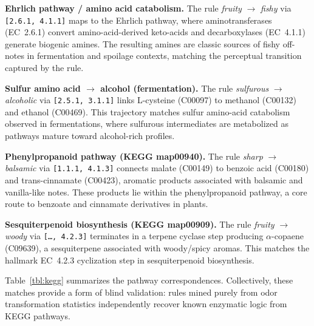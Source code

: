 \documentclass[a4paper,fleqn]{cas-sc}
\begin{document}
\noindent\textbf{Ehrlich pathway / amino acid catabolism.} The rule \emph{fruity} $\rightarrow$ \emph{fishy} via \texttt{[2.6.1, 4.1.1]} maps to the Ehrlich pathway, where aminotransferases (EC~2.6.1) convert amino-acid-derived keto-acids and decarboxylases (EC~4.1.1) generate biogenic amines. The resulting amines are classic sources of fishy off-notes in fermentation and spoilage contexts, matching the perceptual transition captured by the rule. \citep{Hazelwood2008}

\noindent\textbf{Sulfur amino acid $\rightarrow$ alcohol (fermentation).} The rule \emph{sulfurous} $\rightarrow$ \emph{alcoholic} via \texttt{[2.5.1, 3.1.1]} links L-cysteine (C00097) to methanol (C00132) and ethanol (C00469). This trajectory matches sulfur amino-acid catabolism observed in fermentations, where sulfurous intermediates are metabolized as pathways mature toward alcohol-rich profiles. \citep{Kanehisa2021}

\noindent\textbf{Phenylpropanoid pathway (KEGG map00940).} The rule \emph{sharp} $\rightarrow$ \emph{balsamic} via \texttt{[1.1.1, 4.1.3]} connects malate (C00149) to benzoic acid (C00180) and trans-cinnamate (C00423), aromatic products associated with balsamic and vanilla-like notes. These products lie within the phenylpropanoid pathway, a core route to benzoate and cinnamate derivatives in plants. \citep{Kanehisa2021}

\noindent\textbf{Sesquiterpenoid biosynthesis (KEGG map00909).} The rule \emph{fruity} $\rightarrow$ \emph{woody} via \texttt{[\ldots, 4.2.3]} terminates in a terpene cyclase step producing $\alpha$-copaene (C09639), a sesquiterpene associated with woody/spicy aromas. This matches the hallmark EC~4.2.3 cyclization step in sesquiterpenoid biosynthesis. \citep{Kanehisa2021}

Table~\ref{tbl:kegg} summarizes the pathway correspondences. Collectively, these matches provide a form of blind validation: rules mined purely from odor transformation statistics independently recover known enzymatic logic from KEGG pathways.
\end{document}
